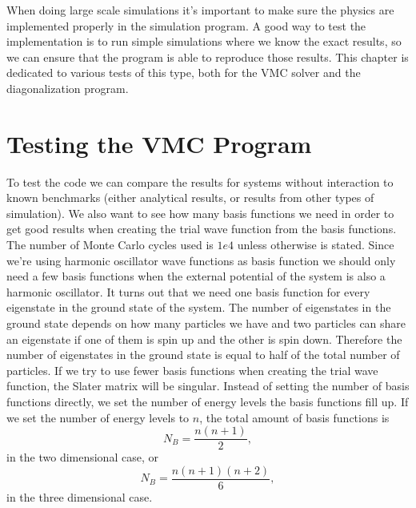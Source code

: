 \documentclass[../main.tex]{subfiles}
\begin{document}
When doing large scale simulations it's important to make sure the physics are implemented properly in the simulation program. A good way to test the implementation is to run simple simulations where we know the exact results, so we can ensure that the program is able to reproduce those results. This chapter is dedicated to various tests of this type, both for the VMC solver and the diagonalization program.

\section{Testing the VMC Program}

To test the code we can compare the results for systems without interaction to known benchmarks (either analytical results, or results from other types of simulation). We also want to see how many basis functions we need in order to get good results when creating the trial wave function from the basis functions. The number of Monte Carlo cycles used is $1e4$ unless otherwise is stated. Since we're using harmonic oscillator wave functions as basis function we should only need a few basis functions when the external potential of the system is also a harmonic oscillator. It turns out that we need one basis function for every eigenstate in the ground state of the system. The number of eigenstates in the ground state depends on how many particles we have and two particles can share an eigenstate if one of them is spin up and the other is spin down. Therefore the number of eigenstates in the ground state is equal to half of the total number of particles. If we try to use fewer basis functions when creating the trial wave function, the Slater matrix will be singular. Instead of setting the number of basis functions directly, we set the number of energy levels the basis functions fill up. If we set the number of energy levels to $n$, the total amount of basis functions is 
\begin{equation}
    N_B = \frac{n(n+1)}{2}, 
\end{equation}
in the two dimensional case, or 
\begin{equation}
    N_B = \frac{n(n+1)(n+2)}{6},
\end{equation}
in the three dimensional case.
\end{document}
